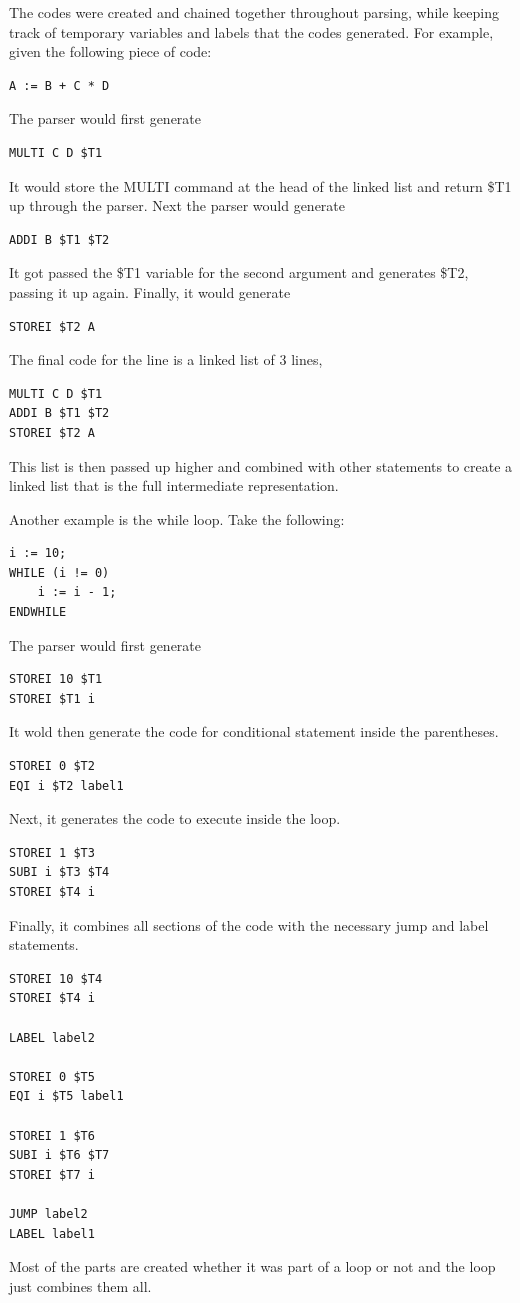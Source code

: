 \documentclass[12pt]{article}
\begin{document}
            The codes were created and chained together throughout parsing, while keeping track of temporary variables and labels that the codes generated.
            For example, given the following piece of code:
            \begin{verbatim}
A := B + C * D
            \end{verbatim}
            The parser would first generate
            \begin{verbatim}
MULTI C D $T1
            \end{verbatim}
            It would store the MULTI command at the head of the linked list and return \$T1 up through the parser.
            Next the parser would generate
            \begin{verbatim}
ADDI B $T1 $T2
            \end{verbatim}
            It got passed the \$T1 variable for the second argument and generates \$T2, passing it up again.
            Finally, it would generate
            \begin{verbatim}
STOREI $T2 A
            \end{verbatim}
            The final code for the line is a linked list of 3 lines,
            \begin{verbatim}
MULTI C D $T1
ADDI B $T1 $T2
STOREI $T2 A
            \end{verbatim}
            This list is then passed up higher and combined with other statements to create a linked list that is the full intermediate representation.

            Another example is the while loop.
            Take the following:
            \begin{verbatim}
i := 10;
WHILE (i != 0)
    i := i - 1;
ENDWHILE
            \end{verbatim}
            The parser would first generate
            \begin{verbatim}
STOREI 10 $T1
STOREI $T1 i
            \end{verbatim}
            It wold then generate the code for conditional statement inside the parentheses.
            \begin{verbatim}
STOREI 0 $T2
EQI i $T2 label1
            \end{verbatim}
            Next, it generates the code to execute inside the loop.
            \begin{verbatim}
STOREI 1 $T3
SUBI i $T3 $T4
STOREI $T4 i
            \end{verbatim}
            Finally, it combines all sections of the code with the necessary jump and label statements.
            \begin{verbatim}
STOREI 10 $T4
STOREI $T4 i

LABEL label2 

STOREI 0 $T5
EQI i $T5 label1

STOREI 1 $T6
SUBI i $T6 $T7
STOREI $T7 i

JUMP label2 
LABEL label1
            \end{verbatim}
            Most of the parts are created whether it was part of a loop or not and the loop just combines them all.
\end{document}
